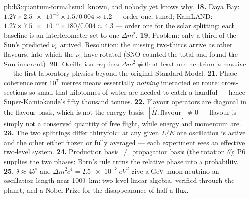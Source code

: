 \begin{solution}{pb:b3:quantum-formalism:1}
known, and nobody yet knows why.
\textbf{18.} Daya Bay: $1.27 \times \num{2.5e-3} \times 1.5/0.004
\approx 1.2$ --- order one, tuned; KamLAND: $1.27 \times
\num{7.5e-5} \times 180/0.004 \approx 4.3$ --- order one for the
solar splitting: each baseline is an interferometer set to one
$\Delta m^2$.
\textbf{19.} Problem: only a third of the Sun's predicted $\nu_e$
arrived. Resolution: the missing two-thirds arrive as other
flavours, into which the $\nu_e$ have rotated (SNO counted the
total and found the Sun innocent).
\textbf{20.} Oscillation requires $\Delta m^2 \neq 0$: at least one
neutrino is massive --- the first laboratory physics beyond the
original Standard Model.
\textbf{21.} Phase coherence over $10^7$ metres means essentially
\emph{nothing} interacted en route: cross-sections so small that
kilotonnes of water are needed to catch a handful --- hence
Super-Kamiokande's fifty thousand tonnes.
\textbf{22.} Flavour operators are diagonal in the flavour basis,
which is not the energy basis: $[\hat H, \text{flavour}] \neq 0$ ---
flavour is simply not a conserved quantity of free flight, while
energy and momentum are.
\textbf{23.} The two splittings differ thirtyfold: at any given
$L/E$ one oscillation is active and the other either frozen or fully
averaged --- each experiment sees an effective two-level system.
\textbf{24.} Production basis $\neq$ propagation basis (the
rotation $\theta$); P6 supplies the two phases; Born's rule turns
the relative phase into a probability.
\textbf{25.} $\theta \approx 45^\circ$ and $\Delta m^2c^4 =
\qty{2.5e-3}{eV^2}$ give a GeV muon-neutrino an oscillation length
near \qty{1000}{km}: two-level linear algebra, verified through the
planet, and a Nobel Prize for the disappearance of half a flux.
\end{solution}
